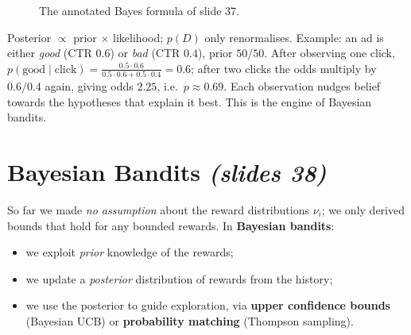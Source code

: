 \documentclass[11pt,a4paper]{article}
\newcommand{\slides}[1]{\emph{(slides #1)}}
\theoremstyle{plain}
\theoremstyle{definition}
\theoremstyle{remark}
\begin{document}
\begin{figure}[ht]
\centering
{}
\caption{The annotated Bayes formula of slide 37.}
\end{figure}

\begin{intuition}
Posterior $\propto$ prior $\times$ likelihood; $p(D)$ only renormalises. Example: an ad is either \emph{good} (CTR $0.6$) or \emph{bad} (CTR $0.4$), prior $50/50$. After observing one click,
$p(\text{good}\mid\text{click})=\frac{0.5\cdot0.6}{0.5\cdot0.6+0.5\cdot0.4}=0.6$; after two clicks the odds multiply by $0.6/0.4$ again, giving odds $2.25$, i.e.\ $p\approx0.69$.
Each observation nudges belief towards the hypotheses that explain it best. This is the engine of Bayesian bandits.
\end{intuition}

\section{Bayesian Bandits \slides{38}}

So far we made \emph{no assumption} about the reward distributions $\nu_i$; we only derived bounds that hold for any bounded rewards. In \textbf{Bayesian bandits}:
\begin{itemize}
 \item we exploit \emph{prior} knowledge of the rewards;
 \item we update a \emph{posterior} distribution of rewards from the history;
 \item we use the posterior to guide exploration, via \textbf{upper confidence bounds} (Bayesian UCB) or \textbf{probability matching} (Thompson sampling).
\end{itemize}
\end{document}
